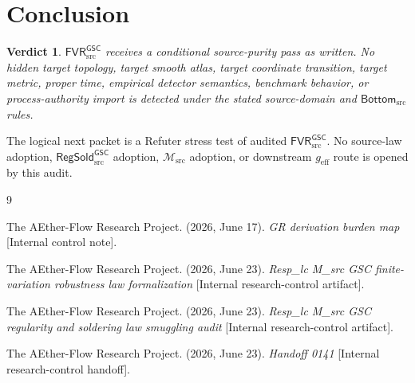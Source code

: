 \documentclass[11pt]{article}
\newcommand{\Msrc}{\mathcal{M}_{\mathrm{src}}}
\newcommand{\geff}{g_{\mathrm{eff}}}
\newcommand{\RegSold}{\mathsf{RegSold}_{\mathrm{src}}^{\mathsf{GSC}}}
\newcommand{\FVR}{\mathsf{FVR}_{\mathrm{src}}^{\mathsf{GSC}}}
\newcommand{\BottomSrc}{\mathsf{Bottom}_{\mathrm{src}}}
\newtheorem{verdict}{Verdict}
\begin{document}
\section{Conclusion}

\begin{verdict}
\(\FVR\) receives a conditional source-purity pass as written. No hidden
target topology, target smooth atlas, target coordinate transition, target
metric, proper time, empirical detector semantics, benchmark behavior, or
process-authority import is detected under the stated source-domain and
\(\BottomSrc\) rules.
\end{verdict}

The logical next packet is a Refuter stress test of audited \(\FVR\). No
source-law adoption, \(\RegSold\) adoption, \(\Msrc\) adoption, or downstream
\(\geff\) route is opened by this audit.

\begin{thebibliography}{9}

The AEther-Flow Research Project. (2026, June 17). \emph{GR derivation
burden map} [Internal control note].

The AEther-Flow Research Project. (2026, June 23). \emph{Resp\_lc M\_src
GSC finite-variation robustness law formalization}
[Internal research-control artifact].

The AEther-Flow Research Project. (2026, June 23). \emph{Resp\_lc M\_src
GSC regularity and soldering law smuggling audit}
[Internal research-control artifact].

The AEther-Flow Research Project. (2026, June 23). \emph{Handoff 0141}
[Internal research-control handoff].

\end{thebibliography}
\end{document}
